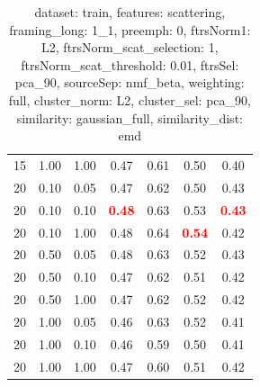 \begin{table}
\begin{center}
\begin{tabular}{lllcccc}
15 & 1.00 & 1.00 & 0.47 & 0.61 & 0.50 & 0.40 \\ 
20 & 0.10 & 0.05 & 0.47 & 0.62 & 0.50 & 0.43 \\ 
20 & 0.10 & 0.10 & \textbf{\textcolor{red}{0.48}} & 0.63 & 0.53 & \textbf{\textcolor{red}{0.43}} \\ 
20 & 0.10 & 1.00 & 0.48 & 0.64 & \textbf{\textcolor{red}{0.54}} & 0.42 \\ 
20 & 0.50 & 0.05 & 0.48 & 0.63 & 0.52 & 0.43 \\ 
20 & 0.50 & 0.10 & 0.47 & 0.62 & 0.51 & 0.42 \\ 
20 & 0.50 & 1.00 & 0.47 & 0.62 & 0.52 & 0.42 \\ 
20 & 1.00 & 0.05 & 0.46 & 0.63 & 0.52 & 0.41 \\ 
20 & 1.00 & 0.10 & 0.46 & 0.59 & 0.50 & 0.41 \\ 
20 & 1.00 & 1.00 & 0.47 & 0.60 & 0.51 & 0.42 \\ 
\end{tabular} 
\end{center} 
\caption{dataset: train, features: scattering, framing\_long: 1\_1, preemph: 0, ftrsNorm1: L2, ftrsNorm\_scat\_selection: 1, ftrsNorm\_scat\_threshold: 0.01, ftrsSel: pca\_90, sourceSep: nmf\_beta, weighting: full, cluster\_norm: L2, cluster\_sel: pca\_90, similarity: gaussian\_full, similarity\_dist: emd} 
\label{datasetrFeaturscFraminlong1_1Preemp0Ftrsnorm1L2Ftrsnoscatselect1Ftrsnoscatthresh0.01Ftrsselpc90SourcesepnmbeWeightfuClustenormL2Clusteselpc90SimilagafuSimiladistem} 
\end{table} 
 
